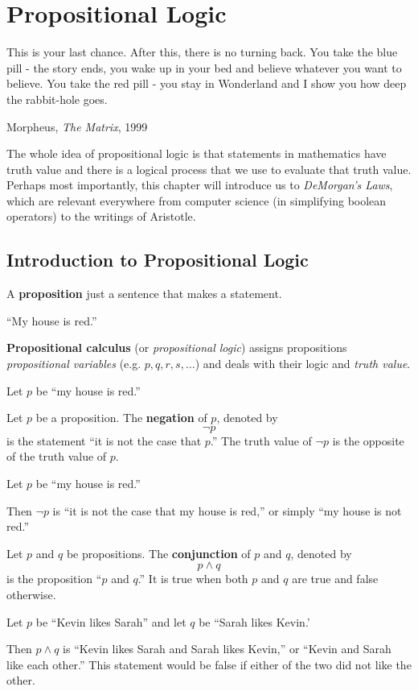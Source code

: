 \chapter{Propositional Logic}
\epigraph{This is your last chance. After this, there is no turning back. You
take the blue pill - the story ends, you wake up in your bed and believe
whatever you want to believe. You take the red pill - you stay in Wonderland and
I show you how deep the rabbit-hole goes.}{Morpheus, \emph{The Matrix}, 1999}
\label{ch:propositional}

The whole idea of propositional logic is that statements in mathematics have truth value and there is a logical process that we use to evaluate that truth value.
Perhaps most importantly, this chapter will introduce us to \emph{DeMorgan's Laws}, which are relevant everywhere from computer science (in simplifying boolean operators) to the writings of Aristotle.

\section{Introduction to Propositional Logic}
\label{sec:propintro}

  A \textbf{proposition} just a sentence that makes a statement.
  \begin{ex}
    ``My house is red.''
  \end{ex}

  \textbf{Propositional calculus} (or \emph{propositional logic}) assigns propositions \emph{propositional variables}
  (e.g. \(p, q, r, s, \ldots\)) and deals with their logic and \emph{truth value}.
  \begin{ex}
    Let $p$ be ``my house is red.''
  \end{ex}

  Let \(p\) be a proposition. The \textbf{negation} of \(p\), denoted by \[\neg p\] is the statement
  ``it is not the case that \(p\).''
  The truth value of \(\neg p\) is the opposite of the truth value of \(p\).
  \begin{ex}
    Let $p$ be ``my house is red.''

    Then $\neg p$ is ``it is not the case that my house is red,'' or simply ``my house is not red.''
  \end{ex}

  Let \(p\) and \(q\) be propositions. The \textbf{conjunction} of \(p\) and \(q\), denoted by \[ p \wedge q \] is the proposition
  ``\(p\) and \(q\).'' It is true when both \(p\) and \(q\) are true and false otherwise.
  \begin{ex}
    Let $p$ be ``Kevin likes Sarah'' and let $q$ be ``Sarah likes Kevin.'

    Then $p \wedge q$ is ``Kevin likes Sarah and Sarah likes Kevin,'' or ``Kevin and Sarah like each other.''
    This statement would be false if either of the two did not like the other.
  \end{ex}

